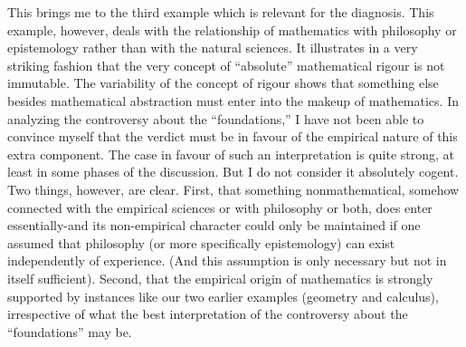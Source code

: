 \documentclass{article}
\begin{document}
This brings me to the third example which is relevant for the diagnosis. This example, however, deals with the relationship of mathematics with philosophy or epistemology rather than with the natural sciences. It illustrates in a very striking fashion that the very concept of ``absolute'' mathematical rigour is not immutable. The variability of the concept of rigour shows that something else besides mathematical abstraction must enter into the makeup of mathematics. In analyzing the controversy about the ``foundations,'' I have not been able to convince myself that the verdict must be in favour of the empirical nature of this extra component. The case in favour of such an interpretation is quite strong, at least in some phases of the discussion. But I do not consider it absolutely cogent. Two things, however, are clear. First, that something nonmathematical, somehow connected with the empirical sciences or with philosophy or both, does enter essentially-and its non-empirical character could only be maintained if one assumed that philosophy (or more specifically epistemology) can exist independently of experience. (And this assumption is only necessary but not in itself sufficient). Second, that the empirical origin of mathematics is strongly supported by instances like our two earlier examples (geometry and calculus), irrespective of what the best interpretation of the controversy about the ``foundations'' may be.
\end{document}
